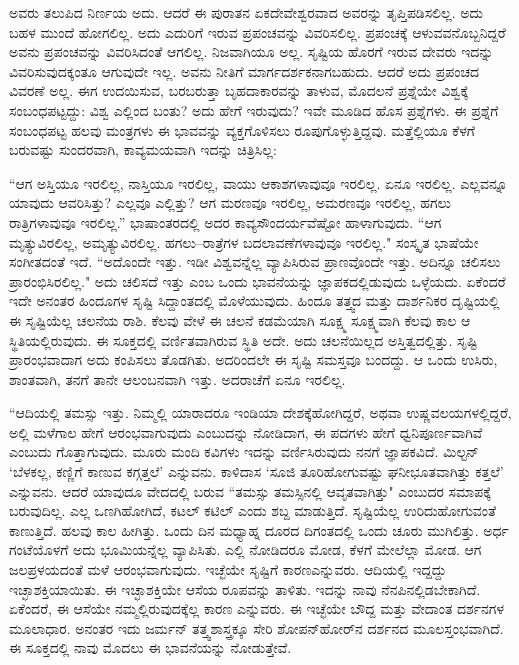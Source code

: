 ಅವರು ತಲುಪಿದ ನಿರ್ಣಯ ಅದು. ಆದರೆ ಈ ಪುರಾತನ ಏಕದೇವೇಶ್ವರವಾದ ಅವರನ್ನು ತೃಪ್ತಿಪಡಿಸಲಿಲ್ಲ. ಅದು ಬಹಳ ಮುಂದೆ ಹೋಗಲಿಲ್ಲ. ಅದು ಎದುರಿಗೆ ಇರುವ ಪ್ರಪಂಚವನ್ನು ವಿವರಿಸಲಿಲ್ಲ. ಪ್ರಪಂಚಕ್ಕೆ ಆಳುವವನೊಬ್ಬನಿದ್ದರೆ ಅವನು ಪ್ರಪಂಚವನ್ನು ವಿವರಿಸಿದಂತೆ ಆಗಲಿಲ್ಲ. ನಿಜವಾಗಿಯೂ ಅಲ್ಲ. ಸೃಷ್ಟಿಯ ಹೊರಗೆ ಇರುವ ದೇವರು ಇದನ್ನು ವಿವರಿಸುವುದಕ್ಕಂತೂ ಆಗುವುದೇ ಇಲ್ಲ. ಅವನು ನೀತಿಗೆ ಮಾರ್ಗದರ್ಶಕನಾಗಬಹುದು. ಆದರೆ ಅದು ಪ್ರಪಂಚದ ವಿವರಣೆ ಅಲ್ಲ. ಈಗ ಉದಯಿಸುವ, ಬರಬರುತ್ತಾ ಬೃಹದಾಕಾರವನ್ನು ತಾಳುವ, ಮೊದಲನೆ ಪ್ರಶ್ನೆಯೇ ವಿಶ್ವಕ್ಕೆ ಸಂಬಂಧಪಟ್ಟದ್ದು: ವಿಶ್ವ ಎಲ್ಲಿಂದ ಬಂತು? ಅದು ಹೇಗೆ ಇರುವುದು? ಇವೇ ಮೂಡಿದ ಹೊಸ ಪ್ರಶ್ನೆಗಳು. ಈ ಪ್ರಶ್ನೆಗೆ ಸಂಬಂಧಪಟ್ಟ ಹಲವು ಮಂತ್ರಗಳು ಈ ಭಾವವನ್ನು ವ್ಯಕ್ತಗೊಳಿಸಲು ರೂಪುಗೊಳ್ಳುತ್ತಿದ್ದವು. ಮತ್ತೆಲ್ಲಿಯೂ ಕೆಳಗೆ ಬರುವಷ್ಟು ಸುಂದರವಾಗಿ, ಕಾವ್ಯಮಯವಾಗಿ ಇದನ್ನು ಚಿತ್ರಿಸಿಲ್ಲ:

“ಆಗ ಅಸ್ತಿಯೂ ಇರಲಿಲ್ಲ, ನಾಸ್ತಿಯೂ ಇರಲಿಲ್ಲ, ವಾಯು ಆಕಾಶಗಳಾವುವೂ ಇರಲಿಲ್ಲ. ಏನೂ ಇರಲಿಲ್ಲ. ಎಲ್ಲವನ್ನೂ ಯಾವುದು ಆವರಿಸಿತ್ತು? ಎಲ್ಲವೂ ಎಲ್ಲಿತ್ತು? ಆಗ ಮರಣವೂ ಇರಲಿಲ್ಲ, ಅಮರಣವೂ ಇರಲಿಲ್ಲ, ಹಗಲು ರಾತ್ರಿಗಳಾವುವೂ ಇರಲಿಲ್ಲ.” ಭಾಷಾಂತರದಲ್ಲಿ ಅದರ ಕಾವ್ಯಸೌಂದರ್ಯವೆಷ್ಟೋ ಹಾಳಾಗುವುದು. “ಆಗ ಮೃತ್ಯುವಿರಲಿಲ್ಲ, ಅಮೃತ್ಯುವಿರಲಿಲ್ಲ. ಹಗಲು–ರಾತ್ರೆಗಳ ಬದಲಾವಣೆಗಳಾವುವೂ ಇರಲಿಲ್ಲ." ಸಂಸ್ಕೃತ ಭಾಷೆಯೇ ಸಂಗೀತದಂತೆ ಇದೆ. “ಅದೊಂದೇ ಇತ್ತು. ಇಡೀ ವಿಶ್ವವನ್ನೆಲ್ಲ ವ್ಯಾಪಿಸಿರುವ ಪ್ರಾಣವೊಂದೇ ಇತ್ತು. ಅದಿನ್ನೂ ಚಲಿಸಲು ಪ್ರಾರಂಭಿಸಿರಲಿಲ್ಲ." ಅದು ಚಲಿಸದೆ ಇತ್ತು ಎಂಬ ಒಂದು ಭಾವನೆಯನ್ನು ಜ್ಞಾಪಕದಲ್ಲಿಡುವುದು ಒಳ್ಳೆಯದು. ಏಕೆಂದರೆ ಇದೇ ಅನಂತರ ಹಿಂದೂಗಳ ಸೃಷ್ಟಿ ಸಿದ್ದಾಂತದಲ್ಲಿ ಮೊಳೆಯುವುದು. ಹಿಂದೂ ತತ್ತ್ವದ ಮತ್ತು ದಾರ್ಶನಿಕರ ದೃಷ್ಟಿಯಲ್ಲಿ ಈ ಸೃಷ್ಟಿಯೆಲ್ಲ ಚಲನೆಯ ರಾಶಿ. ಕೆಲವು ವೇಳೆ ಈ ಚಲನೆ ಕಡಮೆಯಾಗಿ ಸೂಕ್ಷ್ಮ ಸೂಕ್ಷ್ಮವಾಗಿ ಕೆಲವು ಕಾಲ ಆ ಸ್ಥಿತಿಯಲ್ಲಿರುವುದು. ಈ ಸೂಕ್ತದಲ್ಲಿ ವರ್ಣಿತವಾಗಿರುವ ಸ್ಥಿತಿ ಅದೇ. ಅದು ಚಲನೆಯಿಲ್ಲದ ಅಸ್ತಿತ್ವದಲ್ಲಿತ್ತು. ಸೃಷ್ಟಿ ಪ್ರಾರಂಭವಾದಾಗ ಅದು ಕಂಪಿಸಲು ತೊಡಗಿತು. ಅದರಿಂದಲೇ ಈ ಸೃಷ್ಟಿ ಸಮಸ್ತವೂ ಬಂದದ್ದು. ಆ ಒಂದು ಉಸಿರು, ಶಾಂತವಾಗಿ, ತನಗೆ ತಾನೇ ಆಲಂಬನವಾಗಿ ಇತ್ತು. ಅದರಾಚೆಗೆ ಏನೂ ಇರಲಿಲ್ಲ.

“ಆದಿಯಲ್ಲಿ ತಮಸ್ಸು ಇತ್ತು. ನಿಮ್ಮಲ್ಲಿ ಯಾರಾದರೂ ಇಂಡಿಯಾ ದೇಶಕ್ಕೆ\break ಹೋಗಿದ್ದರೆ, ಅಥವಾ ಉಷ್ಣವಲಯಗಳಲ್ಲಿದ್ದರೆ, ಅಲ್ಲಿ ಮಳೆಗಾಲ ಹೇಗೆ ಆರಂಭವಾಗುವುದು ಎಂಬುದನ್ನು ನೋಡಿದಾಗ, ಈ ಪದಗಳು ಹೇಗೆ ಧ್ವನಿಪೂರ್ಣವಾಗಿವೆ ಎಂಬುದು ಗೊತ್ತಾಗುವುದು. ಮೂರು ಮಂದಿ ಕವಿಗಳು ಇದನ್ನು ವರ್ಣಿಸಿರುವುದು ನನಗೆ ಜ್ಞಾಪಕವಿದೆ. ಮಿಲ್ಟನ್  `ಬೆಳಕಲ್ಲ, ಕಣ್ಣಿಗೆ ಕಾಣುವ ಕಗ್ಗತ್ತಲೆ' ಎನ್ನುವನು. ಕಾಳಿದಾಸ `ಸೂಜಿ ತೂರಿಹೋಗುವಷ್ಟು ಘನೀಭೂತವಾಗಿತ್ತು ಕತ್ತಲೆ' ಎನ್ನುವನು. ಆದರೆ ಯಾವುದೂ ವೇದದಲ್ಲಿ ಬರುವ “ತಮಸ್ಸು ತಮಸ್ಸಿನಲ್ಲಿ ಆವೃತವಾಗಿತ್ತು" ಎಂಬುದರ ಸಮಾಪಕ್ಕೆ ಬರುವುದಿಲ್ಲ. ಎಲ್ಲ ಒಣಗಿಹೋಗಿದೆ, ಕಟಲ್ ಕಟಿಲ್ ಎಂದು ಶಬ್ದ ಮಾಡುತ್ತಿದೆ. ಸೃಷ್ಟಿಯೆಲ್ಲ ಉರಿದುಹೋಗುವಂತೆ ಕಾಣುತ್ತಿದೆ. ಹಲವು ಕಾಲ ಹೀಗಿತ್ತು. ಒಂದು ದಿನ ಮಧ್ಯಾಹ್ನ ದೂರದ ದಿಗಂತದಲ್ಲಿ ಒಂದು ಚೂರು ಮುಗಿಲಿತ್ತು. ಅರ್ಧ ಗಂಟೆಯೊಳಗೆ ಅದು ಭೂಮಿಯನ್ನೆಲ್ಲ ವ್ಯಾಪಿಸಿತು. ಎಲ್ಲಿ ನೋಡಿದರೂ ಮೋಡ, ಕೆಳಗೆ ಮೇಲೆಲ್ಲಾ ಮೋಡ. ಆಗ ಜಲಪ್ರಳಯದಂತೆ ಮಳೆ ಆರಂಭವಾಗುವುದು. ಇಚ್ಛೆಯೇ ಸೃಷ್ಟಿಗೆ ಕಾರಣ\break ಎನ್ನುವರು. ಆದಿಯಲ್ಲಿ ಇದ್ದದ್ದು ಇಚ್ಛಾಶಕ್ತಿಯಾಯಿತು. ಈ ಇಚ್ಛಾಶಕ್ತಿಯೇ ಆಸೆಯ ರೂಪವನ್ನು ತಾಳಿತು. ಇದನ್ನು ನಾವು ನೆನಪಿನಲ್ಲಿಡಬೇಕಾಗಿದೆ. ಏಕೆಂದರೆ, ಈ ಆಸೆಯೇ ನಮ್ಮಲ್ಲಿರುವುದಕ್ಕೆಲ್ಲ ಕಾರಣ ಎನ್ನುವರು. ಈ ಇಚ್ಛೆಯೇ ಬೌದ್ದ ಮತ್ತು ವೇದಾಂತ ದರ್ಶನಗಳ ಮೂಲಾಧಾರ. ಅನಂತರ ಇದು ಜರ್ಮನ್ ತತ್ತ್ವಶಾಸ್ತ್ರಕ್ಕೂ ಸೇರಿ ಶೋಪನ್‌ಹೋರ್‌ನ ದರ್ಶನದ ಮೂಲಸ್ತಂಭವಾಗಿದೆ. ಈ ಸೂಕ್ತದಲ್ಲಿ ನಾವು ಮೊದಲು ಈ ಭಾವನೆಯನ್ನು ನೋಡುತ್ತೇವೆ.

